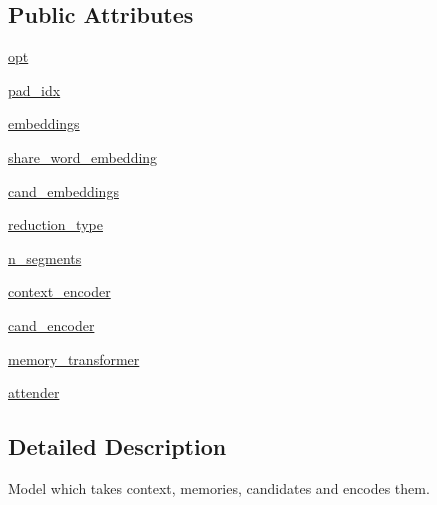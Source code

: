 \subsection*{Public Attributes}
\begin{DoxyCompactItemize}
\item 
\hyperlink{classparlai_1_1agents_1_1transformer_1_1modules_1_1TransformerMemNetModel_a293a7995da2bc66087db07ba4669fb35}{opt}
\item 
\hyperlink{classparlai_1_1agents_1_1transformer_1_1modules_1_1TransformerMemNetModel_ab70ecab55a92126804e165d745642142}{pad\+\_\+idx}
\item 
\hyperlink{classparlai_1_1agents_1_1transformer_1_1modules_1_1TransformerMemNetModel_aa776378904d1ffd3148e330036230713}{embeddings}
\item 
\hyperlink{classparlai_1_1agents_1_1transformer_1_1modules_1_1TransformerMemNetModel_a92d7385aa1b2603fa03ed2f5ad7f66be}{share\+\_\+word\+\_\+embedding}
\item 
\hyperlink{classparlai_1_1agents_1_1transformer_1_1modules_1_1TransformerMemNetModel_a6c12d979c4ce2a21f9a756e7ccc6e7e5}{cand\+\_\+embeddings}
\item 
\hyperlink{classparlai_1_1agents_1_1transformer_1_1modules_1_1TransformerMemNetModel_a3211cf5e4f390d5cf0f7598a7b789985}{reduction\+\_\+type}
\item 
\hyperlink{classparlai_1_1agents_1_1transformer_1_1modules_1_1TransformerMemNetModel_a9ac6c75642035a573f9ac123ee302403}{n\+\_\+segments}
\item 
\hyperlink{classparlai_1_1agents_1_1transformer_1_1modules_1_1TransformerMemNetModel_a899a125583f6fbf7f4809c2744162ac9}{context\+\_\+encoder}
\item 
\hyperlink{classparlai_1_1agents_1_1transformer_1_1modules_1_1TransformerMemNetModel_adf42f25f3ae4564f531835aeec39bb5f}{cand\+\_\+encoder}
\item 
\hyperlink{classparlai_1_1agents_1_1transformer_1_1modules_1_1TransformerMemNetModel_a6d1a5e20639c71de7a60e63b88238784}{memory\+\_\+transformer}
\item 
\hyperlink{classparlai_1_1agents_1_1transformer_1_1modules_1_1TransformerMemNetModel_a95c72e762694a7017243bfcf0b37a1e7}{attender}
\end{DoxyCompactItemize}


\subsection{Detailed Description}
\begin{DoxyVerb}Model which takes context, memories, candidates and encodes them.\end{DoxyVerb}
 

